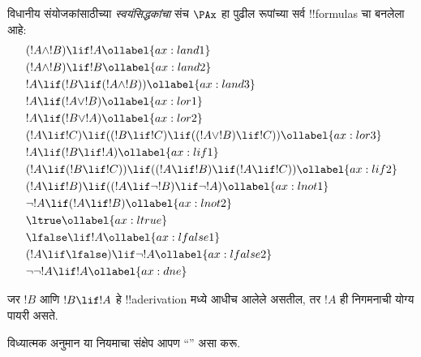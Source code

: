\documentclass[../../../include/open-logic-section]{subfiles}
\begin{document}
      {}
      {}


\begin{defn}[स्वयंसिद्धके]
विधानीय संयोजकांसाठीच्या \emph{स्वयंसिद्धकांचा} संच $\PAx$ हा पुढील रूपांच्या
सर्व !!{formula}s चा बनलेला आहे:
\begin{align}
  & (!A \land !B) \lif !A \ollabel{ax:land1}\\
  & (!A \land !B) \lif !B \ollabel{ax:land2}\\
  & !A \lif (!B \lif (!A \land !B)) \ollabel{ax:land3}\\
  & !A \lif (!A \lor !B) \ollabel{ax:lor1}\\
  & !A \lif (!B \lor !A) \ollabel{ax:lor2}\\
  & (!A \lif !C) \lif ((!B \lif !C) \lif ((!A \lor !B) \lif !C)) \ollabel{ax:lor3}\\
  & !A \lif (!B \lif !A) \ollabel{ax:lif1}\\
  & (!A \lif (!B \lif !C)) \lif ((!A \lif !B) \lif (!A \lif !C)) \ollabel{ax:lif2}\\
  & (!A \lif !B) \lif ((!A \lif \lnot !B) \lif \lnot !A) \ollabel{ax:lnot1}\\
  & \lnot !A \lif (!A \lif !B) \ollabel{ax:lnot2}\\
  & \ltrue \ollabel{ax:ltrue}\\
  & \lfalse \lif !A \ollabel{ax:lfalse1}\\
  & (!A \lif \lfalse) \lif \lnot !A \ollabel{ax:lfalse2}\\
  & \lnot\lnot !A \lif !A \ollabel{ax:dne}
\end{align}
\end{defn}

\begin{defn}[विध्यात्मक अनुमान]
  जर $!B$ आणि $!B \lif !A$ हे !!a{derivation} मध्ये आधीच आलेले असतील,
  तर $!A$ ही निगमनाची योग्य पायरी असते.
\end{defn}

विध्यात्मक अनुमान या नियमाचा संक्षेप आपण ``\MP'' असा करू.
\end{document}
